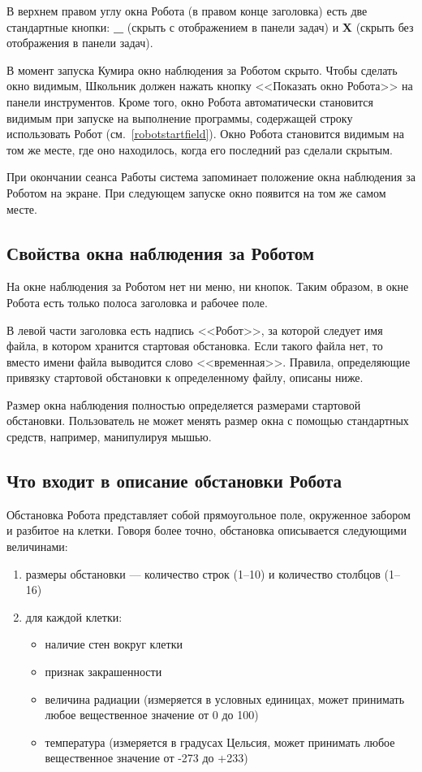 \documentclass[12pt,a4paper]{article}
\begin{document}
В верхнем  правом углу окна Робота (в правом конце заголовка) есть две стандартные кнопки: \textbf{\_} (скрыть с отображением в панели задач) и \textbf{X} (скрыть без отображения в панели задач).

В момент запуска Кумира окно наблюдения за Роботом скрыто. Чтобы сделать окно видимым, Школьник должен нажать кнопку <<Показать окно Робота>> на панели инструментов. Кроме того, окно Робота автоматически становится видимым  при запуске на выполнение программы, содержащей строку \textsf{использовать Робот} (см.~\ref{robotstartfield}). Окно Робота становится видимым на том же месте, где оно находилось, когда его последний раз сделали скрытым.

При окончании сеанса Работы система запоминает положение окна наблюдения за Роботом на экране. При следующем запуске окно появится на том же самом месте.
	
\subsection{Свойства окна наблюдения за Роботом}

На окне наблюдения за Роботом нет ни меню, ни кнопок. Таким образом, в окне Робота есть только полоса заголовка и рабочее поле.

В левой части заголовка есть надпись <<Робот>>, за которой следует имя файла, в котором хранится стартовая обстановка. Если такого файла нет, то вместо имени файла выводится слово <<временная>>.  Правила, определяющие привязку стартовой обстановки к определенному файлу, описаны ниже.

Размер окна наблюдения полностью определяется размерами стартовой обстановки. Пользователь не может менять размер окна с помощью стандартных средств, например, манипулируя мышью.

\subsection{Что входит в описание обстановки Робота}

Обстановка Робота представляет собой прямоугольное поле, окруженное забором и разбитое на клетки. Говоря более точно, обстановка описывается следующими величинами:
\begin{enumerate}
\item размеры обстановки --- количество строк (1--10) и количество столбцов (1--16)
\item для каждой клетки:
\begin{itemize}
\item наличие стен вокруг клетки
\item признак закрашенности
\item величина радиации (измеряется в условных единицах, может принимать любое вещественное значение от 0 до 100)
\item температура (измеряется в градусах Цельсия, может принимать любое вещественное значение от -273 до +233)
\end{itemize}
\end{enumerate}
\end{document}
